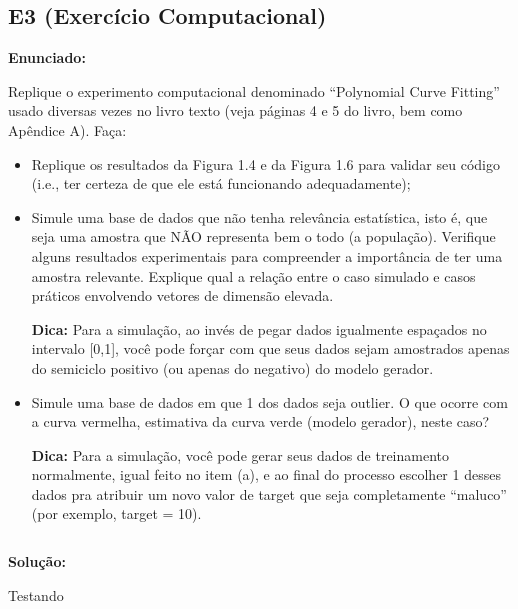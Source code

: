 \subsection{E3 (Exercício Computacional)}
\textbf{Enunciado:} \par
Replique o experimento computacional denominado “Polynomial Curve Fitting” usado diversas vezes no livro texto (veja páginas 4 e 5 do livro, bem como Apêndice A).
Faça:
\begin{itemize}

    \item Replique os resultados da Figura 1.4 e da Figura 1.6 para validar seu código (i.e., ter certeza de que ele está funcionando adequadamente);
    
    \item Simule uma base de dados que não tenha relevância estatística, isto é, que seja uma amostra que NÃO representa bem o todo (a população). Verifique alguns resultados experimentais para     compreender a importância de ter uma amostra relevante. Explique qual a relação entre o caso simulado e casos práticos envolvendo vetores de dimensão elevada.
    
    \textbf{Dica:} Para a simulação, ao invés de pegar dados igualmente espaçados no intervalo [0,1], você pode forçar com que seus dados sejam amostrados apenas do semiciclo positivo (ou apenas do negativo) do modelo gerador.

    \item Simule uma base de dados em que 1 dos dados seja outlier. O que ocorre com a curva vermelha, estimativa da curva verde (modelo gerador), neste caso?
    
    \textbf{Dica:} Para a simulação, você pode gerar seus dados de treinamento normalmente, igual feito no item (a), e ao final do processo escolher 1 desses dados pra atribuir um novo valor de target que seja completamente “maluco” (por exemplo, target = 10).
\end{itemize}
$ $ 
\newline \par
\textbf{Solução:}

Testando
